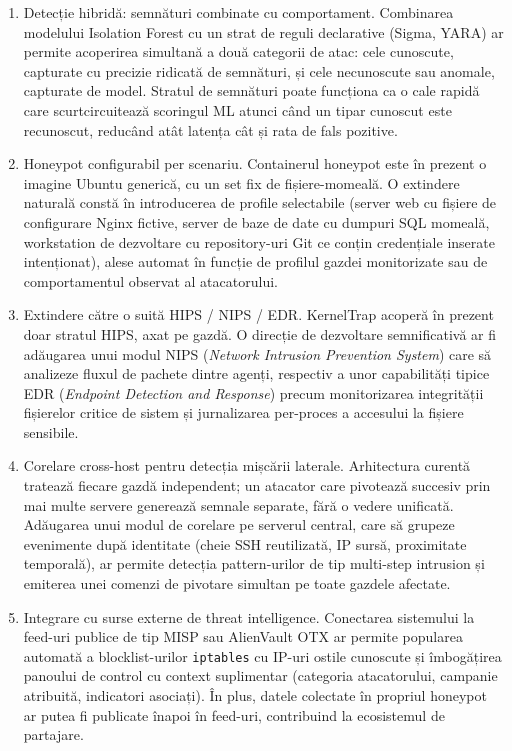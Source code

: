 \documentclass[12pt, a4paper]{report}
\begin{document}
\begin{enumerate}
  \item Detecție hibridă: semnături combinate cu comportament.
    Combinarea modelului Isolation Forest cu un strat de reguli declarative
    (Sigma, YARA) ar permite acoperirea simultană a două categorii de atac:
    cele cunoscute, capturate cu precizie ridicată de semnături, și cele
    necunoscute sau anomale, capturate de model. Stratul de semnături poate
    funcționa ca o cale rapidă care scurtcircuitează scoringul ML atunci când
    un tipar cunoscut este recunoscut, reducând atât latența cât și rata de
    fals pozitive.

  \item Honeypot configurabil per scenariu.
    Containerul honeypot este în prezent o imagine Ubuntu generică, cu un
    set fix de fișiere-momeală. O extindere naturală constă în introducerea
    de profile selectabile (server web cu fișiere de configurare Nginx
    fictive, server de baze de date cu dumpuri SQL momeală, workstation de
    dezvoltare cu repository-uri Git ce conțin credențiale inserate
    intenționat), alese automat în funcție de profilul gazdei monitorizate
    sau de comportamentul observat al atacatorului.

  \item Extindere către o suită HIPS / NIPS / EDR.
    KernelTrap acoperă în prezent doar stratul HIPS, axat pe gazdă. O
    direcție de dezvoltare semnificativă ar fi adăugarea unui modul NIPS
    (\textit{Network Intrusion Prevention System}) care să analizeze fluxul
    de pachete dintre agenți, respectiv a unor capabilități tipice EDR
    (\textit{Endpoint Detection and Response}) precum monitorizarea
    integrității fișierelor critice de sistem și jurnalizarea per-proces
    a accesului la fișiere sensibile.

  \item Corelare cross-host pentru detecția mișcării laterale.
    Arhitectura curentă tratează fiecare gazdă independent; un atacator
    care pivotează succesiv prin mai multe servere generează semnale
    separate, fără o vedere unificată. Adăugarea unui modul de corelare pe
    serverul central, care să grupeze evenimente după identitate (cheie
    SSH reutilizată, IP sursă, proximitate temporală), ar permite detecția
    pattern-urilor de tip multi-step intrusion și emiterea unei comenzi de
    pivotare simultan pe toate gazdele afectate.

  \item Integrare cu surse externe de threat intelligence.
    Conectarea sistemului la feed-uri publice de tip MISP sau AlienVault OTX
    ar permite popularea automată a blocklist-urilor \texttt{iptables} cu
    IP-uri ostile cunoscute și îmbogățirea panoului de control cu context
    suplimentar (categoria atacatorului, campanie atribuită, indicatori
    asociați). În plus, datele colectate în propriul honeypot ar putea fi
    publicate înapoi în feed-uri, contribuind la ecosistemul de partajare.


\end{enumerate}
\end{document}
